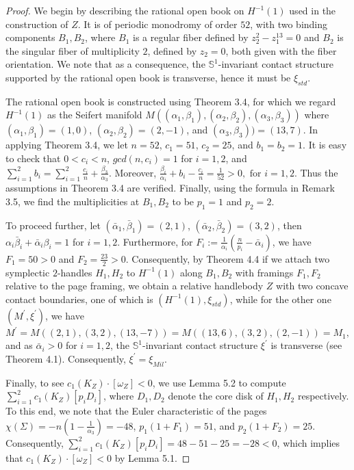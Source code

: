 \documentclass[11pt]{amsart}
\theoremstyle{plain}
\numberwithin{theorem}{section}
\theoremstyle{definition}
\newcommand{\s}{{\mathbb S}}
\begin{document}
\begin{proof}
We begin by describing the rational open book on $H^{-1}(1)$ used in the construction of $Z$.
It is of periodic monodromy of order $52$, with two binding components $B_1,B_2$, where
$B_1$ is a regular fiber defined by $z_2^2-z_1^{13}=0$ and $B_2$ is the singular fiber of multiplicity $2$, defined by $z_2=0$, both given with the fiber orientation. We note that as a consequence, the $\s^1$-invariant contact structure supported by the rational open book is transverse, hence it must be $\xi_{std}$. 

The rational open book is constructed using Theorem 3.4, for which we 
regard $H^{-1}(1)$ as the Seifert manifold $M((\alpha_1,\beta_1), (\alpha_2,\beta_2),
(\alpha_3,\beta_3))$ where $(\alpha_1,\beta_1)=(1,0)$, $(\alpha_2,\beta_2)=(2,-1)$, and 
$(\alpha_3,\beta_3))=(13,7)$. In applying Theorem 3.4, we let $n=52$, $c_1=51$, $c_2=25$,
and $b_1=b_2=1$. It is easy to check that $0<c_i<n$, $gcd(n,c_i)=1$ for $i=1,2$, and
$\sum_{i=1}^2 b_i=\sum_{i=1}^2 \frac{c_i}{n}+\frac{\beta_3}{\alpha_3}$. Moreover,
$\frac{\beta_i}{\alpha_i}+b_i-\frac{c_i}{n}=\frac{1}{52}>0, \mbox{ for } i=1,2$. Thus the assumptions 
in Theorem 3.4 are verified. Finally, using the formula in Remark 3.5, we find the multiplicities at 
$B_1,B_2$ to be $p_1=1$ and $p_2=2$.

To proceed further, let $(\bar{\alpha}_1,\bar{\beta}_1)=(2,1)$,  $(\bar{\alpha}_2,\bar{\beta}_2)=(3,2)$, 
then $\alpha_i\bar{\beta}_i+\bar{\alpha}_i\beta_i=1$ for $i=1,2$. Furthermore, for 
$F_i:=\frac{1}{\alpha_i}(\frac{n}{p_i}-\bar{\alpha}_i)$, we have $F_1=50>0$ and $F_2=\frac{23}{2}>0$.
Consequently, by Theorem 4.4 if we attach two symplectic $2$-handles $H_1,H_2$ to $H^{-1}(1)$ along $B_1,B_2$ with framings $F_1,F_2$ relative to the page framing, we obtain a relative handlebody $Z$ with
two concave contact boundaries, one of which is $(H^{-1}(1),\xi_{std})$, while for the other one
$(M^\prime,\xi^\prime)$, we have 
$$
M^\prime=M((2,1),(3,2), (13,-7))=M((13,6), (3,2),(2,-1))=M_1,
$$
and as $\bar{\alpha}_i>0$ for $i=1,2$, the $\s^1$-invariant contact structure $\xi^\prime$ is transverse
(see Theorem 4.1). Consequently,  $\xi^\prime=\xi_{Mil}$. 

Finally, to see $c_1(K_{Z})\cdot [\omega_{Z}]<0$, we use Lemma 5.2 to compute 
$\sum_{i=1}^2 c_1(K_Z)[p_i D_i]$, where $D_1,D_2$ denote the core disk of $H_1,H_2$ respectively. To this end, we note that the Euler characteristic of the pages 
$\chi(\Sigma)=-n(1-\frac{1}{\alpha_3})=-48$, $p_1(1+F_1)=51$,
and $p_2(1+F_2)=25$. Consequently, $\sum_{i=1}^2 c_1(K_Z)[p_i D_i]=48-51-25=-28<0$,
which implies that $c_1(K_{Z})\cdot [\omega_{Z}]<0$ by Lemma 5.1. 

\end{proof}
\end{document}
